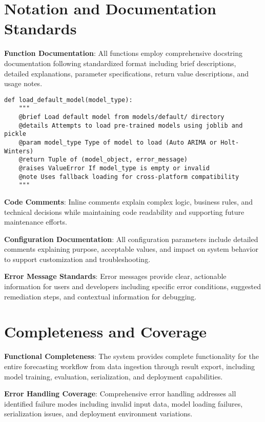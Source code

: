 \section{Notation and Documentation Standards}

\textbf{Function Documentation}: All functions employ comprehensive docstring documentation following standardized format including brief descriptions, detailed explanations, parameter specifications, return value descriptions, and usage notes.

\begin{lstlisting}[style=bashstyle, caption={Standard Function Documentation}]
	def load_default_model(model_type):
	"""
	@brief Load default model from models/default/ directory
	@details Attempts to load pre-trained models using joblib and pickle
	@param model_type Type of model to load (Auto ARIMA or Holt-Winters)
	@return Tuple of (model_object, error_message)
	@raises ValueError If model_type is empty or invalid
	@note Uses fallback loading for cross-platform compatibility
	"""
\end{lstlisting}

\textbf{Code Comments}: Inline comments explain complex logic, business rules, and technical decisions while maintaining code readability and supporting future maintenance efforts.

\textbf{Configuration Documentation}: All configuration parameters include detailed comments explaining purpose, acceptable values, and impact on system behavior to support customization and troubleshooting.

\textbf{Error Message Standards}: Error messages provide clear, actionable information for users and developers including specific error conditions, suggested remediation steps, and contextual information for debugging.

\section{Completeness and Coverage}

\textbf{Functional Completeness}: The system provides complete functionality for the entire forecasting workflow from data ingestion through result export, including model training, evaluation, serialization, and deployment capabilities.

\textbf{Error Handling Coverage}: Comprehensive error handling addresses all identified failure modes including invalid input data, model loading failures, serialization issues, and deployment environment variations.

